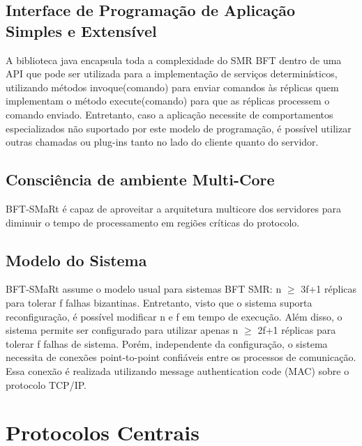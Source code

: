 		\subsection{Interface de Programação de Aplicação Simples e Extensível}
		A biblioteca java encapsula toda a complexidade do SMR BFT dentro de uma API que pode ser utilizada para a implementação de serviços determinísticos, utilizando métodos invoque(comando) para enviar comandos às réplicas quem implementam o método execute(comando) para que as réplicas processem o comando enviado. Entretanto, caso a aplicação necessite de comportamentos especializados não suportado por este modelo de programação, é possível utilizar outras chamadas ou plug-ins tanto no lado do cliente quanto do servidor.\\
		
		
		\subsection{Consciência de ambiente Multi-Core}
		BFT-SMaRt é capaz de aproveitar a arquitetura multicore dos servidores para diminuir o tempo de processamento em regiões críticas do protocolo.\\
		
		\subsection{Modelo do Sistema}
		BFT-SMaRt assume o modelo usual para sistemas BFT SMR: n $\geq$ 3f+1 réplicas para tolerar f falhas bizantinas. Entretanto, visto que o sistema suporta reconfiguração, é possível modificar n e f em tempo de execução. Além disso, o sistema permite ser configurado para utilizar apenas n $\geq$ 2f+1 réplicas para tolerar f falhas de sistema. Porém, independente da configuração, o sistema necessita de conexões point-to-point confiáveis entre os processos de comunicação. Essa conexão é realizada utilizando message authentication code (MAC) sobre o protocolo TCP/IP.\\
	
	\section{Protocolos Centrais}
	
